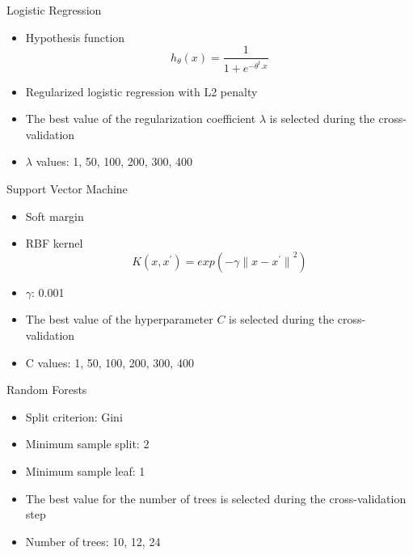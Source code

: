 \documentclass[12pt]{beamer}
\begin{document}
\begin{frame}{Logistic Regression}
    \begin{itemize}
        \item Hypothesis function
        \begin{equation}
            \label{eq:regularized_logistic_regression}
            h_{\theta}(x) = \frac{1}{1 + {e}^{-{\theta}^{t}. x}}
        \end{equation}
        \item Regularized logistic regression with L2 penalty
        \item The best value of the regularization coefficient $\lambda$ is selected during the cross-validation
        \item $\lambda$ values: 1, 50, 100, 200, 300, 400
    \end{itemize}
\end{frame}

\begin{frame}{Support Vector Machine}
    \begin{itemize}
        \item Soft margin
        \item RBF kernel
        \begin{equation}
            \label{eq:rbf_kernel}
            K(x, x^{'}) = exp(- \gamma {\lVert x - x^{'} \rVert}^{2})
        \end{equation}
        \item $\gamma$: 0.001
        \item The best value of the hyperparameter $C$ is selected during the cross-validation
        \item C values: 1, 50, 100, 200, 300, 400
    \end{itemize}
\end{frame}

\begin{frame}{Random Forests}
    \begin{itemize}
        \item Split criterion: Gini
        \item Minimum sample split: 2
        \item Minimum sample leaf: 1
        \item The best value for the number of trees is selected during the cross-validation step
        \item Number of trees: 10, 12, 24
    \end{itemize}
\end{frame}
\end{document}
